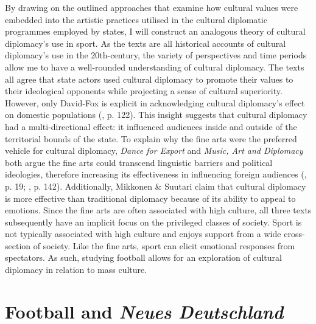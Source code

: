 By drawing on the outlined approaches that examine how cultural values were embedded into the artistic practices utilised in the cultural diplomatic programmes employed by states, I will construct an analogous theory of cultural diplomacy’s use in sport. As the texts are all historical accounts of cultural diplomacy’s use in the 20th-century, the variety of perspectives and time periods allow me to have a well-rounded understanding of cultural diplomacy. The texts all agree that state actors used cultural diplomacy to promote their values to their ideological opponents while projecting a sense of cultural superiority. However, only David-Fox is explicit in acknowledging cultural diplomacy’s effect on domestic populations (\citeyear{david-fox2011}, p. 122). This insight suggests that cultural diplomacy had a multi-directional effect: it influenced audiences inside and outside of the territorial bounds of the state. To explain why the fine arts were the preferred vehicle for cultural diplomacy, \textit{Dance for Export} and \textit{Music, Art and Diplomacy} both argue the fine arts could transcend linguistic barriers and political ideologies, therefore increasing its effectiveness in influencing foreign audiences (\cite{prevots1998}, p. 19; \cite{gonçalves2016}, p. 142). Additionally, Mikkonen \& Suutari claim that cultural diplomacy is more effective than traditional diplomacy because of its ability to appeal to emotions. Since the fine arts are often associated with high culture, all three texts subsequently have an implicit focus on the privileged classes of society. Sport is not typically associated with high culture and enjoys support from a wide cross-section of society. Like the fine arts, sport can elicit emotional responses from spectators. As such, studying football allows for an exploration of cultural diplomacy in relation to mass culture.

\section{Football and \textit{Neues Deutschland}}

